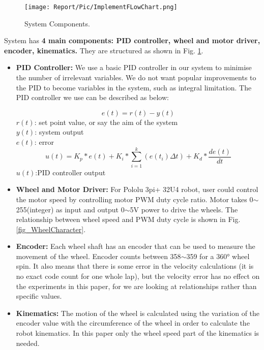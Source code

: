 \documentclass[conference]{IEEEtran}
\begin{document}
\begin{figure}[htbp]
\centerline{\texttt{[image: Report/Pic/ImplementFLowChart.png]}}
\caption{System Components.}
\label{fig_ImplementFlowChart}
\end{figure}

System has \textbf{4 main components: PID controller, wheel and motor driver, encoder, kinematics.} They are structured as shown in Fig. \ref{fig_ImplementFlowChart}. 
\begin{itemize}
    \item\textbf{PID Controller: } We use a basic PID controller in our system to minimise the number of irrelevant variables. We do not want popular improvements to the PID to become variables in the system, such as integral limitation. The PID controller we use can be described as below:
    
    
        \begin{equation}\label{PID_1}
            e(t) = r(t) - y(t)      
        \end{equation}
        $r(t)$: set point value, or say the aim of the system\\
        $y(t)$: system output \\
        $e(t)$: error
        \begin{equation}\label{PID_2}
            u(t)=K_{p}*e(t)+K_{i} * \sum_{i=1}^{k}  (e(t_{i})\Delta t)+K_{d} * \frac{de(t)}{dt}
        \end{equation}
        $u(t)$:PID controller output
        \par
    \item\textbf{Wheel and Motor Driver: }For Pololu 3pi+ 32U4 robot, user could control the motor speed by controlling motor PWM duty cycle ratio. Motor takes 0$\sim$255(integer) as input and output 0$\sim$5V power to drive the wheels. The relationship between wheel speed and PWM duty cycle is shown in Fig. \ref{fig_WheelCharacter}.
    \item\textbf{Encoder: }Each wheel shaft has an encoder that can be used to measure the movement of the wheel. Encoder counts between 358$\sim$359 for a 360° wheel spin. It also means that there is some error in the velocity calculations (it is no exact code count for one whole lap), but the velocity error has no effect on the experiments in this paper, for we are looking at relationships rather than specific values.
    \item\textbf{Kinematics: }The motion of the wheel is calculated using the variation of the encoder value with the circumference of the wheel in order to calculate the robot kinematics. In this paper only the wheel speed part of the kinematics is needed.

\end{itemize}
\end{document}
